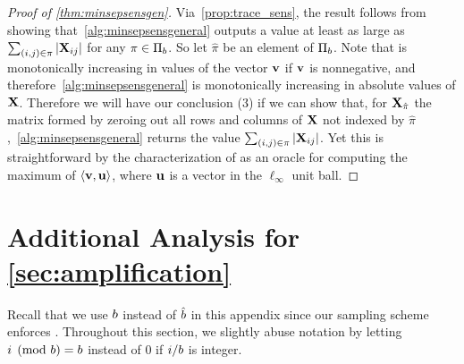 \documentclass{article}
\begin{document}
\begin{proof}[Proof of \cref{thm:minsepsensgen}]Via~\cref{prop:trace_sens}, the result follows from showing that~\cref{alg:minsepsensgeneral} outputs a value at least as large as $\sum_{(i, j) \in \pi} |\mathbf{X}_{ij}|$ for any $\pi \in \Pi_{b}$. So let $\hat{\pi}$ be an element of $\Pi_{b}$. Note that \VecSens is monotonically increasing in values of the vector $\mathbf{v}$ if $\mathbf{v}$ is nonnegative, and therefore~\cref{alg:minsepsensgeneral} is monotonically increasing in absolute values of $\mathbf{X}$. Therefore we will have our conclusion (3) if we can show that, for $\mathbf{X}_{\hat{\pi}}$ the matrix formed by zeroing out all rows and columns of $\mathbf{X}$ not indexed by $\hat{\pi}$,~\cref{alg:minsepsensgeneral} returns the value $\sum_{(i, j) \in \pi} |\mathbf{X}_{ij}|$. Yet this is straightforward by the characterization of \VecSens as an oracle for computing the maximum of $\langle \mathbf{v}, \mathbf{u} \rangle$, where $\mathbf{u}$ is a vector in the $\ell_\infty$ unit ball.
\end{proof}


\section{Additional Analysis for \cref{sec:amplification}}\label{sec:app-amplification}

Recall that we use $b$ instead of $\hat{b}$ in this appendix since our sampling scheme enforces \multiepochpart. Throughout this section, we slightly abuse notation by letting $i \pmod {b} = b$ instead of $0$ if $i / b$ is integer. 
\end{document}
